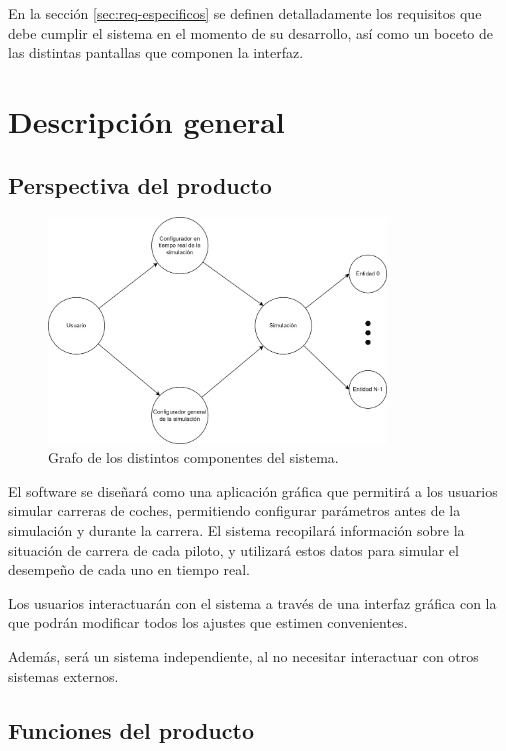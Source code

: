 En la sección \ref{sec:req-especificos} se definen detalladamente los requisitos que debe cumplir el sistema en el momento de su desarrollo, así como un boceto de las distintas pantallas que componen la interfaz.

\section{Descripción general}
\label{sec:req-des-gen}
\subsection{Perspectiva del producto}

\begin{figure}[H]
    \centering
    \includegraphics[width=0.8\textwidth]{imagenes/grafo-sistema.drawio.png}
    \caption{Grafo de los distintos componentes del sistema.}
 \end{figure}

El software se diseñará como una aplicación gráfica que permitirá a los usuarios simular carreras de coches, permitiendo configurar parámetros antes de la simulación y durante la carrera. El sistema recopilará información sobre la situación de carrera de cada piloto, y utilizará estos datos para simular el desempeño de cada uno en tiempo real.

\bigskip

Los usuarios interactuarán con el sistema a través de una interfaz gráfica con la que podrán modificar todos los ajustes que estimen convenientes.

\bigskip

Además, será un sistema independiente, al no necesitar interactuar con otros sistemas externos.

\subsection{Funciones del producto}

